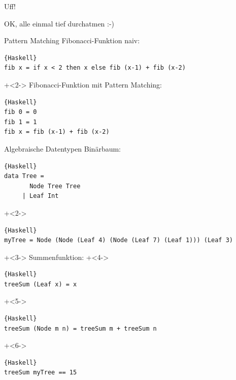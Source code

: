 \begin{frame}[fragile]{Uff!}

\begin{center}
\Large
OK, alle einmal tief durchatmen :-)
\end{center}

\end{frame}

\begin{frame}[fragile]{Pattern Matching}
Fibonacci-Funktion \glqq naiv\grqq{}:
\begin{lstlisting}{Haskell}
fib x = if x < 2 then x else fib (x-1) + fib (x-2)
\end{lstlisting}

\onslide+<2->
\vfill
Fibonacci-Funktion mit Pattern Matching:
\begin{lstlisting}{Haskell}
fib 0 = 0
fib 1 = 1
fib x = fib (x-1) + fib (x-2)
\end{lstlisting}
\end{frame}

\begin{frame}[fragile]{Algebraische Datentypen}
Binärbaum:
\begin{lstlisting}{Haskell}
data Tree =
       Node Tree Tree
     | Leaf Int
\end{lstlisting}

\onslide+<2->
\begin{lstlisting}{Haskell}
myTree = Node (Node (Leaf 4) (Node (Leaf 7) (Leaf 1))) (Leaf 3)
\end{lstlisting}

\onslide+<3->
Summenfunktion:
\onslide+<4->
\begin{lstlisting}{Haskell}
treeSum	(Leaf x) = x
\end{lstlisting}
\onslide+<5->
\vspace{-1.1em}
\begin{lstlisting}{Haskell}
treeSum (Node m n) = treeSum m + treeSum n
\end{lstlisting}
\onslide+<6->
\begin{lstlisting}{Haskell}
treeSum myTree == 15
\end{lstlisting}
\end{frame}


